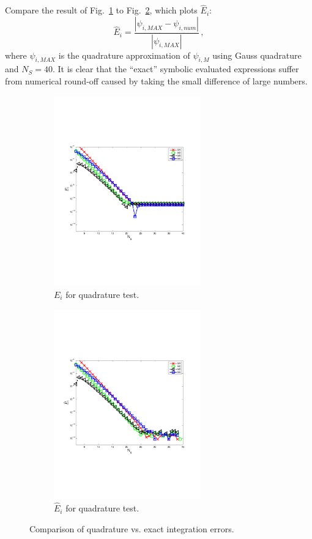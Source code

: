 \documentclass{mc2015}
\newcommand{\fig}[1]{Fig.~\ref{#1}}                      %
\newcommand{\benum}{\begin{equation}} 			%
\newcommand{\eenum}{\end{equation}}
\newcommand{\abs}[1]{\ensuremath{\left\lvert #1 \right\rvert}}
\newcommand{\pec}{\, ,}
\begin{document}
Compare the result of \fig{fig:quad_err} to \fig{fig:no_err}, which plots $\widehat{E}_i$:  
\benum
\widehat{E}_{i} = \frac{\abs{ \psi_{i,MAX} - \psi_{i,num} }}{\abs{\psi_{i,MAX} }} \pec
\eenum
where $\psi_{i,MAX}$ is the quadrature approximation of $\psi_{i,M}$ using Gauss quadrature and $N_S = 40$.
It is clear that the ``exact'' symbolic evaluated expressions suffer from numerical round-off caused by taking the small difference of large numbers.
%
\begin{figure}[h]
\begin{center}
	\begin{subfigure}{0.45\textwidth}
		\includegraphics[width=2.5in,trim=0.5in  2.5in  1.0in 2.5in,clip=true]{err_gauss_to_matlab_exact.pdf}
		\caption{$E_i$ for quadrature test.}
		\label{fig:quad_err}
	\end{subfigure}
	\begin{subfigure}{0.45\textwidth}
		\includegraphics[width=2.5in,trim=0.5in  2.5in  1in 2.5in,clip=true]{err_gauss_to_highest_gauss.pdf}
		\caption{$\widehat{E}_i$ for quadrature test.}
		\label{fig:no_err}
	\end{subfigure}
\caption{Comparison of quadrature vs. exact integration errors.}
\label{fig:error_comparisons}
\end{center}
\end{figure}
\end{document}
